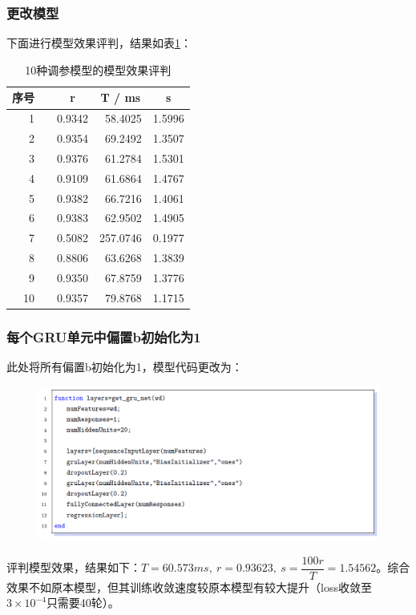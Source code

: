 \documentclass[aspectratio=169, 10pt, utf8, mathserif]{beamer}
\begin{document}
\begin{frame}
	\frametitle{更改模型}
	下面进行模型效果评判，结果如表\ref{tab:my-table1}：
	
	
	\begin{table}[H]
		\centering
		\caption{10种调参模型的模型效果评判}
		\label{tab:my-table1}
		\begin{tabular}{rrrrr}
			\hline
			序号& & \multicolumn{1}{c}{r} & \multicolumn{1}{c}{T / ms} & \multicolumn{1}{c}{s} \\ \hline
			1 & & 0.9342                & 58.4025               & 1.5996                \\
			2&  & 0.9354                & 69.2492               & 1.3507                \\
			3 & & 0.9376                & 61.2784               & 1.5301                \\
			4  && 0.9109                & 61.6864               & 1.4767                \\
			5  && 0.9382                & 66.7216               & 1.4061                \\
			6  && 0.9383                & 62.9502               & 1.4905                \\
			7  && 0.5082                & 257.0746              & 0.1977                \\
			8  && 0.8806                & 63.6268               & 1.3839                \\
			9  && 0.9350                & 67.8759               & 1.3776                \\
			10 && 0.9357                & 79.8768               & 1.1715                \\ \hline
		\end{tabular}
	\end{table}
\end{frame}	
\begin{frame}
	\frametitle{每个GRU单元中偏置b初始化为1}
	此处将所有偏置b初始化为1，模型代码更改为：
	\begin{figure}[H]
		\centering
		\includegraphics[width=0.7\linewidth]{pic/screenshot038}
		\label{fig:screenshot038}
	\end{figure}
	评判模型效果，结果如下：$  T=60.573ms, \ r=0.93623,\ s=\dfrac{100r}{T}=1.54562$。综合效果不如原本模型，但其训练收敛速度较原本模型有较大提升（loss收敛至$ 3\times 10^{-4} $只需要40轮）。
\end{frame}	
\end{document}
